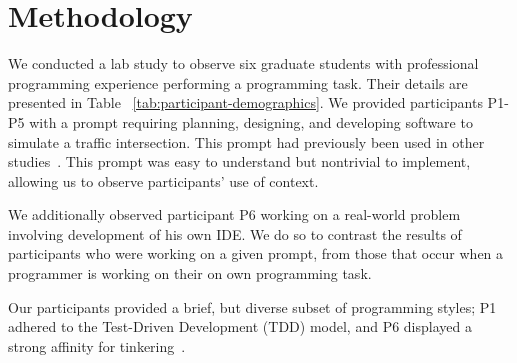 
\section{Methodology}\label{sec:methodology}


We conducted a lab study to observe six graduate students with professional programming experience performing a programming task. Their details are presented in Table ~\ref{tab:participant-demographics}.
We provided participants P1-P5 with a prompt requiring planning, designing, and developing software to simulate a traffic intersection. This prompt had previously been used in other studies~\cite{Mangano:2012}. This prompt was easy to understand but nontrivial to implement, allowing us to observe participants' use of context. 

We additionally observed participant P6 working on a real-world problem involving development of his own IDE. We do so to contrast the results of participants who were working on a given prompt, from those that occur when a programmer is working on their on own programming task.




Our participants provided a brief, but diverse subset of programming styles; P1 adhered to the Test-Driven Development (TDD) model, and P6 displayed a strong affinity for tinkering~\cite{Beckwith:2006}. %


